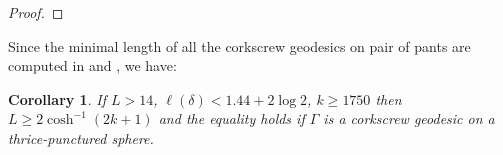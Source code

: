 \documentclass[11pt, a4paper]{article}
\newtheorem{cor}[thm]{Corollary}
\theoremstyle{definition}
\theoremstyle{remark}
\begin{document}
\begin{proof}

\end{proof}

Since the minimal length of all the corkscrew geodesics on pair of pants are computed in \cite{B2803} and \cite{B2795}, we have:

\begin{cor}
 If $L>14$, $\ell(\delta)<1.44+2\log2$, $k\geqslant1750$ then $L\geqslant2\cosh^{-1}(2k+1)$ and the equality holds if $\Gamma$ is a corkscrew geodesic on a thrice-punctured sphere.
\end{cor}
\end{document}
